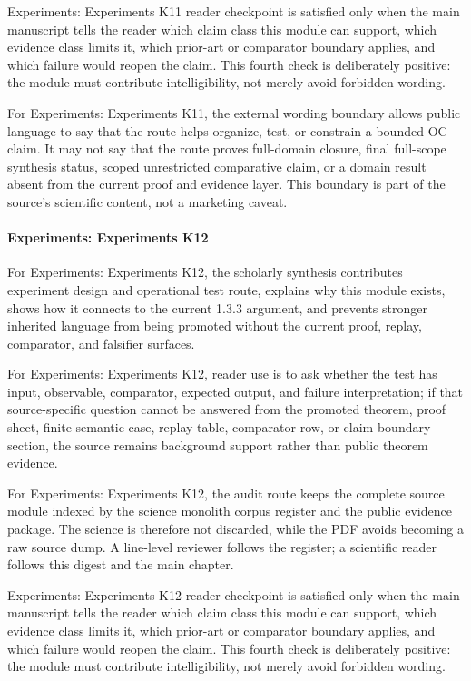 Experiments: Experiments K11 reader checkpoint is satisfied only when the main manuscript tells the reader which claim class this module can support, which evidence class limits it, which prior-art or comparator boundary applies, and which failure would reopen the claim. This fourth check is deliberately positive: the module must contribute intelligibility, not merely avoid forbidden wording.


For Experiments: Experiments K11, the external wording boundary allows public language to say that the route helps organize, test, or constrain a bounded OC claim. It may not say that the route proves full-domain closure, final full-scope synthesis status, scoped unrestricted comparative claim, or a domain result absent from the current proof and evidence layer. This boundary is part of the source's scientific content, not a marketing caveat.


\paragraph{Experiments: Experiments K12}

For Experiments: Experiments K12, the scholarly synthesis contributes experiment design and operational test route, explains why this module exists, shows how it connects to the current 1.3.3 argument, and prevents stronger inherited language from being promoted without the current proof, replay, comparator, and falsifier surfaces.


For Experiments: Experiments K12, reader use is to ask whether the test has input, observable, comparator, expected output, and failure interpretation; if that source-specific question cannot be answered from the promoted theorem, proof sheet, finite semantic case, replay table, comparator row, or claim-boundary section, the source remains background support rather than public theorem evidence.


For Experiments: Experiments K12, the audit route keeps the complete source module indexed by the science monolith corpus register and the public evidence package. The science is therefore not discarded, while the PDF avoids becoming a raw source dump. A line-level reviewer follows the register; a scientific reader follows this digest and the main chapter.


Experiments: Experiments K12 reader checkpoint is satisfied only when the main manuscript tells the reader which claim class this module can support, which evidence class limits it, which prior-art or comparator boundary applies, and which failure would reopen the claim. This fourth check is deliberately positive: the module must contribute intelligibility, not merely avoid forbidden wording.


